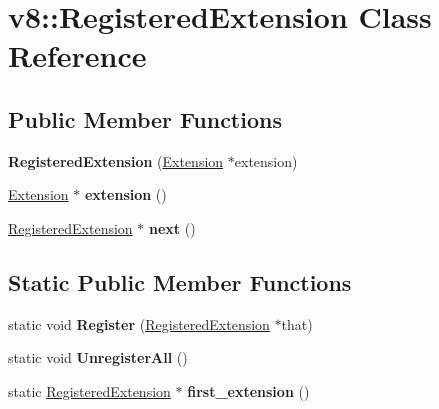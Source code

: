 \hypertarget{classv8_1_1_registered_extension}{}\section{v8\+:\+:Registered\+Extension Class Reference}
\label{classv8_1_1_registered_extension}
\subsection*{Public Member Functions}
\begin{DoxyCompactItemize}
\item 
{\bfseries Registered\+Extension} (\hyperlink{classv8_1_1_extension}{Extension} $\ast$extension)\hypertarget{classv8_1_1_registered_extension_ae35b6424afab40f3949c99a407ee2836}{}\label{classv8_1_1_registered_extension_ae35b6424afab40f3949c99a407ee2836}

\item 
\hyperlink{classv8_1_1_extension}{Extension} $\ast$ {\bfseries extension} ()\hypertarget{classv8_1_1_registered_extension_a84de5a581f562ad1b12f137471a42258}{}\label{classv8_1_1_registered_extension_a84de5a581f562ad1b12f137471a42258}

\item 
\hyperlink{classv8_1_1_registered_extension}{Registered\+Extension} $\ast$ {\bfseries next} ()\hypertarget{classv8_1_1_registered_extension_a5863f0a2b1da0565c2baef1a0783d21a}{}\label{classv8_1_1_registered_extension_a5863f0a2b1da0565c2baef1a0783d21a}

\end{DoxyCompactItemize}
\subsection*{Static Public Member Functions}
\begin{DoxyCompactItemize}
\item 
static void {\bfseries Register} (\hyperlink{classv8_1_1_registered_extension}{Registered\+Extension} $\ast$that)\hypertarget{classv8_1_1_registered_extension_a72fd9f2241a87703870e11c475c6f471}{}\label{classv8_1_1_registered_extension_a72fd9f2241a87703870e11c475c6f471}

\item 
static void {\bfseries Unregister\+All} ()\hypertarget{classv8_1_1_registered_extension_a77b6380f53298a8a5c22f9900d4bd194}{}\label{classv8_1_1_registered_extension_a77b6380f53298a8a5c22f9900d4bd194}

\item 
static \hyperlink{classv8_1_1_registered_extension}{Registered\+Extension} $\ast$ {\bfseries first\+\_\+extension} ()\hypertarget{classv8_1_1_registered_extension_afa3d987dc559af8c07555a817d907698}{}\label{classv8_1_1_registered_extension_afa3d987dc559af8c07555a817d907698}

\end{DoxyCompactItemize}
